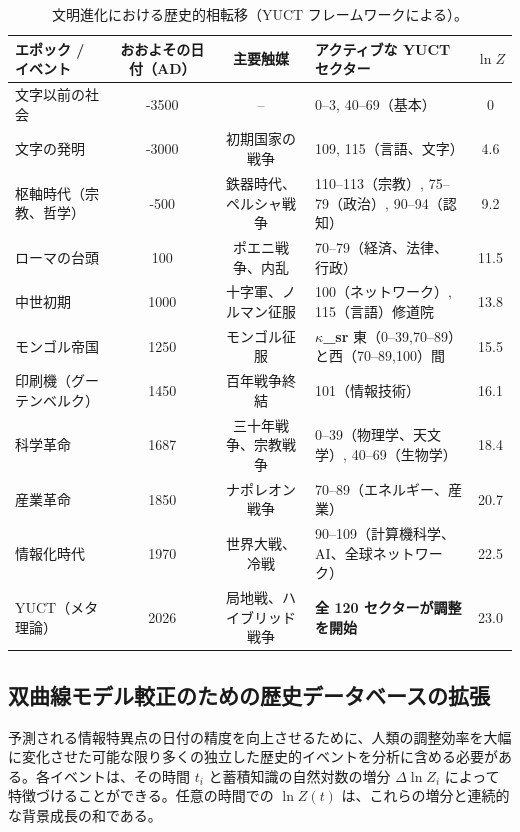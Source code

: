 \documentclass[12pt,a4paper]{article}
\theoremstyle{remark}
\begin{document}
	\begin{table}[htbp]
		\centering
		\caption{文明進化における歴史的相転移（YUCT フレームワークによる）。}
		\label{tab:historical-transitions}
		\scriptsize  
		\begin{tabular}{p{2.2cm} c c p{5.5cm} c}
			\toprule
			\textbf{エポック / イベント} & \textbf{おおよその日付（AD）} & \textbf{主要触媒} & \textbf{アクティブな YUCT セクター} & $\ln Z$ \\
			\midrule
			文字以前の社会 & -3500 & – & 0–3, 40–69（基本） & 0 \\
			文字の発明 & -3000 & 初期国家の戦争 & 109, 115（言語、文字） & 4.6 \\
			枢軸時代（宗教、哲学） & -500 & 鉄器時代、ペルシャ戦争 & 110–113（宗教）, 75–79（政治）, 90–94（認知） & 9.2 \\
			ローマの台頭 & 100 & ポエニ戦争、内乱 & 70–79（経済、法律、行政） & 11.5 \\
			中世初期 & 1000 & 十字軍、ノルマン征服 & 100（ネットワーク）, 115（言語）修道院 & 13.8 \\
			モンゴル帝国 & 1250 & モンゴル征服 & \textbf{$\kappa$\_sr} 東（0–39,70–89）と西（70–89,100）間 & 15.5 \\
			印刷機（グーテンベルク） & 1450 & 百年戦争終結 & 101（情報技術） & 16.1 \\
			科学革命 & 1687 & 三十年戦争、宗教戦争 & 0–39（物理学、天文学）, 40–69（生物学） & 18.4 \\
			産業革命 & 1850 & ナポレオン戦争 & 70–89（エネルギー、産業） & 20.7 \\
			情報化時代 & 1970 & 世界大戦、冷戦 & 90–109（計算機科学、AI、全球ネットワーク） & 22.5 \\
			YUCT（メタ理論） & 2026 & 局地戦、ハイブリッド戦争 & \textbf{全 120 セクターが調整を開始} & 23.0 \\
			\bottomrule
		\end{tabular}
	\end{table}
	
	\subsection{双曲線モデル較正のための歴史データベースの拡張}
	\label{subsec:historical-data}
	
	予測される情報特異点の日付の精度を向上させるために、人類の調整効率を大幅に変化させた可能な限り多くの独立した歴史的イベントを分析に含める必要がある。各イベントは、その時間 \(t_i\) と蓄積知識の自然対数の増分 \(\Delta \ln Z_i\) によって特徴づけることができる。任意の時間での \(\ln Z(t)\) は、これらの増分と連続的な背景成長の和である。
	
\end{document}

